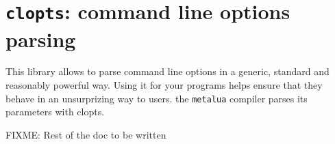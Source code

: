 \section{{\tt clopts}: command line options parsing}
This library allows to parse command line options in a generic, standard and
reasonably powerful way. Using it for your programs helps ensure that they
behave in an unsurprizing way to users. the {\tt metalua} compiler parses its
parameters with clopts.

FIXME: Rest of the doc to be written
